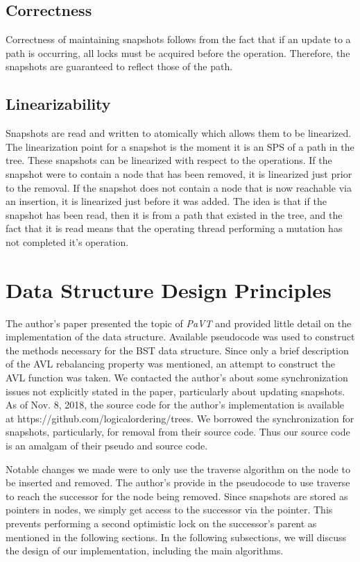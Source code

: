 \documentclass[conference]{IEEEtran}
\theoremstyle{definition}
\theoremstyle{theorem}
\begin{document}
\subsection{Correctness}
Correctness of maintaining snapshots follows from the fact that if an update to a path is occurring, all locks must be acquired before the operation. Therefore, the snapshots are guaranteed to reflect those of the path. 
\subsection{Linearizability}
Snapshots are read and written to atomically which allows them to be linearized. The linearization point for a snapshot is the moment it is an SPS of a path in the tree. These snapshots can be linearized with respect to the operations. If the snapshot were to contain a node that has been removed, it is linearized just prior to the removal. If the snapshot does not contain a node that is now reachable via an insertion, it is linearized just before it was added. The idea is that if the snapshot has been read, then it is from a path that existed in the tree, and the fact that it is read means that the operating thread performing a mutation has not completed it's operation. 
\section{Data Structure Design Principles}

The author's paper presented the topic of \textit{PaVT} and provided little detail on the implementation of the data structure. Available pseudocode was used to construct the methods necessary for the BST data structure. Since only a brief description of the AVL rebalancing property was mentioned, an attempt to construct the AVL function was taken. We contacted the author's about some synchronization issues not explicitly stated in the paper, particularly about updating snapshots. As of Nov. 8, 2018, the source code for the author's implementation is available at {https://github.com/logicalordering/trees}. We borrowed the synchronization for snapshots, particularly, for removal from their source code. Thus our source code is an amalgam of their pseudo and source code. 

Notable changes we made were to only use the traverse algorithm on the node to be inserted and removed. The author's provide in the pseudocode to use traverse to reach the successor for the node being removed. Since snapshots are stored as pointers in nodes, we simply get access to the successor via the pointer. This prevents performing a second optimistic lock on the successor's parent as mentioned in the following sections. In the following subsections, we will discuss the design of our implementation, including the main algorithms.
\end{document}
